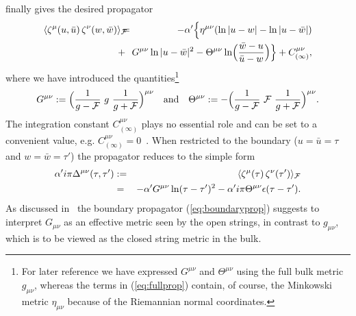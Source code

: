 \documentclass[a4paper,12pt]{article}
\let\bra=\langle        \let\ket=\rangle
\newcommand {\cF} {{\cal F}}
\begin{document}
finally gives the desired propagator~\cite{Abouelsaood:1987gd,Callan:1987bc}
\begin{eqnarray}
  \label{eq:fullprop}
  \bra \zeta^\mu(u,\bar u)\,\zeta^\nu(w,\bar w)\ket_\cF 
  \hspace{-3pt}&\hspace{-5pt}=\hspace{-5pt}&\hspace{-3pt} 
  -\alpha' \Bigl\{\eta^{\mu\nu} (\ln |u-w| - \ln |u-\bar w|) \nonumber\\
 \hspace{-3pt}&\hspace{-7pt}+ \hspace{-7pt}&\hspace{-3pt}
   G^{\mu\nu} \ln |u-\bar w|^2 
  -\Theta^{\mu\nu} \ln \Bigl(\frac {\bar w - u}{\bar u-w}\Bigr)\Bigr\} 
  + C^{\mu\nu}_{(\infty)},
\end{eqnarray}
where we have introduced the quantities\footnote{For later reference 
        we have expressed $G^{\mu\nu}$ and $\Theta^{\mu\nu}$ using the full
        bulk metric $g_{\mu\nu}$, whereas the terms in 
        (\ref{eq:fullprop}) contain, of course, the Minkowski metric 
        $\eta_{\mu\nu}$ because of the
        Riemannian normal coordinates.}
\begin{equation}
  \label{eq:openmetric}
  G^{\mu\nu} := \Bigl(\frac 1{g-\cF}~g~\frac 1{g+\cF} \Bigr)^{\mu\nu} 
  \quad \mathrm{and} \quad
  \Theta^{\mu\nu} := -\Bigl(\frac 1{g-\cF}~\cF~\frac 1{g+\cF} \Bigr)^{\mu\nu}.
\end{equation}
The integration constant $C^{\mu\nu}_{(\infty)}$ plays no 
essential role and can be set to a convenient value, e.g. 
$C^{\mu\nu}_{(\infty)}=0$~\cite{Seiberg:1999vs}. 
When restricted to the boundary ($u = \bar u = \tau$
and $w = \bar w = \tau'$) the propagator reduces to the simple form
\begin{eqnarray}
  \label{eq:boundaryprop}
  \alpha' i \pi \Delta^{\mu\nu}(\tau,\tau') 
  &:=& \bra \zeta^\mu(\tau)\,\zeta^\nu(\tau')\ket_\cF \nonumber\\
  & =& -\alpha' G^{\mu\nu} \ln (\tau-\tau')^2
       -\alpha' i \pi \Theta^{\mu\nu} \epsilon(\tau-\tau').
\end{eqnarray}
As discussed in~\cite{Seiberg:1999vs} the boundary 
propagator (\ref{eq:boundaryprop}) suggests to interpret $G_{\mu\nu}$ as an
effective metric seen by the open strings, in contrast to $g_{\mu\nu}$, which 
is to be viewed as the closed string metric in the bulk. 
\end{document}
